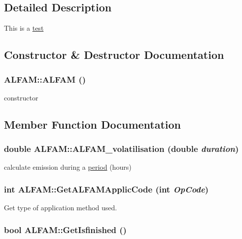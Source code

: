\subsection{Detailed Description}
This is a \hyperlink{classtest}{test} 

\subsection{Constructor \& Destructor Documentation}
\hypertarget{class_a_l_f_a_m_a47d3c530b41e72e8c529ec2cf4abce6a}{
\subsubsection[{ALFAM}]{\setlength{\rightskip}{0pt plus 5cm}ALFAM::ALFAM ()}}
\label{class_a_l_f_a_m_a47d3c530b41e72e8c529ec2cf4abce6a}
constructor 

\subsection{Member Function Documentation}
\hypertarget{class_a_l_f_a_m_a62aa5a49fec33e4706b60b907e7170f3}{
\subsubsection[{ALFAM\_\-volatilisation}]{\setlength{\rightskip}{0pt plus 5cm}double ALFAM::ALFAM\_\-volatilisation (double {\em duration})}}
\label{class_a_l_f_a_m_a62aa5a49fec33e4706b60b907e7170f3}


calculate emission during a \hyperlink{classperiod}{period} (hours) \hypertarget{class_a_l_f_a_m_ac888410a9da9ca21e48daa4abc468614}{
\subsubsection[{GetALFAMApplicCode}]{\setlength{\rightskip}{0pt plus 5cm}int ALFAM::GetALFAMApplicCode (int {\em OpCode})}}
\label{class_a_l_f_a_m_ac888410a9da9ca21e48daa4abc468614}


Get type of application method used. \hypertarget{class_a_l_f_a_m_a5e3967d1a434cf9367281cfe881c65d6}{
\subsubsection[{GetIsfinished}]{\setlength{\rightskip}{0pt plus 5cm}bool ALFAM::GetIsfinished ()}}
\label{class_a_l_f_a_m_a5e3967d1a434cf9367281cfe881c65d6}


